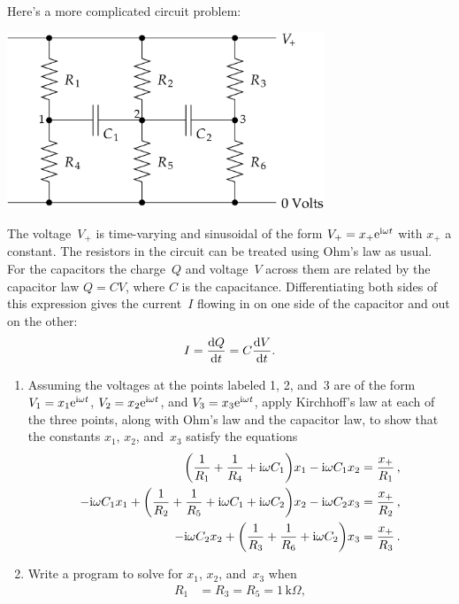 \documentclass[12pt]{article}
\begin{document}
\begin{exercises}
\exercise Here's a more complicated circuit problem:
\medskip
\begin{center}
\includegraphics[width=9.5cm]{rescap.eps}
\end{center}
The voltage~$V_+$ is time-varying and sinusoidal of the form $V_+ = x_+
\mathrm{e}^{\mathrm{i}\omega t}$ with $x_+$ a constant.  The resistors in the circuit can
be treated using Ohm's law as usual.  For the capacitors the charge~$Q$ and
voltage~$V$ across them are related by the capacitor law $Q=CV$, where $C$
is the capacitance.  Differentiating both sides of this expression gives
the current~$I$ flowing in on one side of the capacitor and out on the
other:
\begin{displaymath}
I = {\mathrm{d} Q\over\mathrm{d} t} = C {\mathrm{d} V\over\mathrm{d} t}.
\end{displaymath}
\begin{enumerate}\setlength{\itemsep}{0pt}
\item Assuming the voltages at the points labeled 1, 2, and~3 are of the form
$V_1 = x_1 \mathrm{e}^{\mathrm{i}\omega t}$, $V_2 = x_2 \mathrm{e}^{\mathrm{i}\omega t}$, and $V_3 = x_3
\mathrm{e}^{\mathrm{i}\omega t}$, apply Kirchhoff's law at each of the three points, along
with Ohm's law and the capacitor law, to show that the constants $x_1$,
$x_2$, and~$x_3$ satisfy the equations
\begin{align*}
\biggl( {1\over R_1} + {1\over R_4} + \mathrm{i}\omega C_1 \biggr) x_1
  - \mathrm{i}\omega C_1 x_2 &= {x_+\over R_1}\,, \\
- \mathrm{i}\omega C_1 x_1
+ \biggl( {1\over R_2} + {1\over R_5} + \mathrm{i}\omega C_1 + \mathrm{i}\omega C_2
          \biggr) x_2 - \mathrm{i}\omega C_2 x_3 &= {x_+\over R_2}\,, \\
- \mathrm{i}\omega C_2 x_2
+ \biggl( {1\over R_3} + {1\over R_6} + \mathrm{i}\omega C_2 \biggr) x_3
  &= {x_+\over R_3}\,.
\end{align*}
\item Write a program to solve for $x_1$, $x_2$, and~$x_3$ when
\begin{align*}
R_1 &= R_3 = R_5 = 1\,\mathrm{k}\Omega, \\

\end{align*}
\end{enumerate}
\end{exercises}
\end{document}
